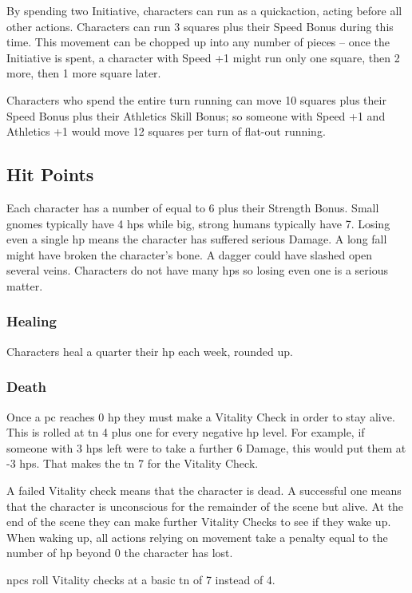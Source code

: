\begin{multicols}{2}
By spending two Initiative, characters can run as a \gls{quickaction}, acting before all other actions.
Characters can run 3 squares plus their Speed Bonus during this time.
This movement can be chopped up into any number of pieces -- once the Initiative is spent, a character with Speed +1 might run only one square, then 2 more, then 1 more square later.

Characters who spend the entire turn running can move 10 squares plus their Speed Bonus plus their Athletics Skill Bonus; so someone with Speed +1 and Athletics +1 would move 12 squares per turn of flat-out running.


\subsection{Hit Points}

Each character has a number of  equal to 6 plus their Strength Bonus.
Small gnomes typically have 4 \glspl{hp} while big, strong humans typically have 7.
Losing even a single \gls{hp} means the character has suffered serious Damage.
A long fall might have broken the character's bone.
A dagger could have slashed open several veins.
Characters do not have many \glspl{hp} so losing even one is a serious matter.

\subsubsection{Healing}
Characters heal a quarter their \gls{hp} each week, rounded up.

\subsubsection{Death}
Once a \gls{pc} reaches 0 \gls{hp} they must make a Vitality Check in order to stay alive.
This is rolled at \gls{tn} 4 plus one for every negative \gls{hp} level.\iftoggle{verbose}{\footnote{Traits such as Strength do not affect the Vitality check because in a way, they already have.
Stronger characters already have more \gls{hp}, which has already kept them farther from death.}}{}
For example, if someone with 3 \glspl{hp} left were to take a further 6 Damage, this would put them at -3 \glspl{hp}.
That makes the \gls{tn} 7 for the Vitality Check.

A failed Vitality check means that the character is dead.%
\iftoggle{verbose}{%
\footnote{See page \pageref{pcdeath} on what to do once a \gls{pc} dies.}%
}{%
	The player must roll up a new character with either 50 \glspl{xp} or half the total \glspl{xp} of whichever party member has the most \glspl{xp}.
}%
A successful one means that the character is unconscious for the remainder of the scene but alive.
At the end of the scene they can make further Vitality Checks to see if they wake up.
When waking up, all actions relying on movement take a penalty equal to the number of \gls{hp} beyond 0 the character has lost.

\glspl{npc} roll Vitality checks at a basic \gls{tn} of 7 instead of 4.


\end{multicols}

